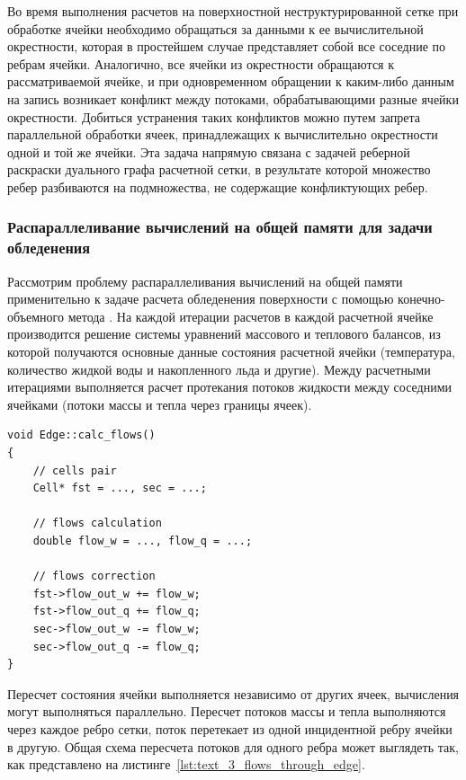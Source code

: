 Во время выполнения расчетов на поверхностной неструктурированной сетке при обработке ячейки необходимо обращаться за данными к ее вычислительной окрестности, которая в простейшем случае представляет собой все соседние по ребрам ячейки.
Аналогично, все ячейки из окрестности обращаются к рассматриваемой ячейке, и при одновременном обращении к каким-либо данным на запись возникает конфликт между потоками, обрабатывающими разные ячейки окрестности.
Добиться устранения таких конфликтов можно путем запрета параллельной обработки ячеек, принадлежащих к вычислительно окрестности одной и той же ячейки.
Эта задача напрямую связана с задачей реберной раскраски дуального графа расчетной сетки, в результате которой множество ребер разбиваются на подмножества, не содержащие конфликтующих ребер.

\subsubsection{Распараллеливание вычислений на общей памяти для задачи обледенения}\label{sec:text_3_edge_coloring}

Рассмотрим проблему распараллеливания вычислений на общей памяти применительно к задаче расчета обледенения поверхности с помощью конечно-объемного метода \cite{Gulicheva2024}.
На каждой итерации расчетов в каждой расчетной ячейке производится решение системы уравнений массового и теплового балансов, из которой получаются основные данные состояния расчетной ячейки (температура, количество жидкой воды и накопленного льда и другие).
Между расчетными итерациями выполняется расчет протекания потоков жидкости между соседними ячейками (потоки массы и тепла через границы ячеек).

\begin{lstlisting}[caption={Расчет протекания потоков через ребро сетки.}, label={lst:text_3_flows_through_edge}]
void Edge::calc_flows()
{
    // cells pair
    Cell* fst = ..., sec = ...;

    // flows calculation
    double flow_w = ..., flow_q = ...;

    // flows correction
    fst->flow_out_w += flow_w;
    fst->flow_out_q += flow_q;
    sec->flow_out_w -= flow_w;
    sec->flow_out_q -= flow_q;
}
\end{lstlisting}

Пересчет состояния ячейки выполняется независимо от других ячеек, вычисления могут выполняться параллельно.
Пересчет потоков массы и тепла выполняются через каждое ребро сетки, поток перетекает из одной инцидентной ребру ячейки в другую.
Общая схема пересчета потоков для одного ребра может выглядеть так, как представлено на листинге~\ref{lst:text_3_flows_through_edge}.

